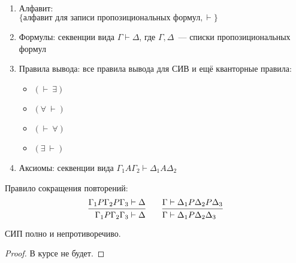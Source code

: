 \documentclass[main]{subfiles}
\begin{document}
\begin{definition}
    \

    \begin{enumerate}
        \item Алфавит: \\
              $\{\text{алфавит для записи пропозициональных формул}, \vdash\}$
        \item Формулы: секвенции вида $\Gamma \vdash \Delta$,  где $\Gamma, \Delta$~--- списки пропозициональных формул
        \item Правила вывода: все правила вывода для СИВ и ещё кванторные правила:
              \begin{itemize}
                  \item $(\vdash \ \exists)$
                  \item $(\forall \ \vdash)$
                  \item $(\vdash \ \forall)$
                  \item $(\exists \ \vdash)$
              \end{itemize}
        \item Аксиомы: секвенции вида $\Gamma_1 A \Gamma_2 \vdash \Delta_1 A \Delta_2$
    \end{enumerate}
\end{definition}
Правило сокращения повторений:
\begin{gather*}
    \begin{prooftree}
        \hypo{\Gamma_1 P \Gamma_2 P \Gamma_3 & \vdash \Delta}
        \infer1{\Gamma_1 P \Gamma_2 \Gamma_3 & \vdash \Delta}
    \end{prooftree} \qquad
    \begin{prooftree}
        \hypo{\Gamma & \vdash \Delta_1 P \Delta_2 P \Delta_3}
        \infer1{\Gamma &\vdash \Delta_1 P \Delta_2 \Delta_3}
    \end{prooftree}
\end{gather*}
\begin{theorem}
    СИП полно и непротиворечиво.
\end{theorem}
\begin{proof}
    В курсе не будет.
\end{proof}
\end{document}
